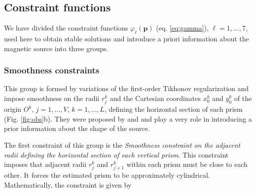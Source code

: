\subsection{Constraint functions}

We have divided the constraint functions $\varphi_{\ell}(\mathbf{p})$ (eq. \ref{eq:gamma}), $\ell = 1, \dots, 7$, used here to 
obtain stable solutions and introduce a priori information about the magnetic source into three groups.



\subsubsection{Smoothness constraints}

This group is formed by variations of the first-order Tikhonov regularization \citep[][ p. 103]{aster-etal2019}
and impose smoothness on the radii $r_{j}^{k}$ and the Cartesian coordinates $x_{0}^{k}$ and $y_{0}^{k}$ of the origin 
$O^{k}$, $j = 1, \dots, V$, $k = 1, \dots, L$, defining the horizontal section of each prism (Fig. \ref{fig:obs}b).
They were proposed by \cite{oliveirajr-etal2011} and \cite{oliveirajr-barbosa2013} and play a very 
role in introducing a prior information about the shape of the source. 

The first constraint of this group is the \textit{Smoothness constraint on the adjacent radii defining the horizontal 
section of each vertical prism}. This constraint imposes that adjacent radii $r_{j}^{k}$ and $r_{j+1}^{k}$ within each 
prism must be close to each other. It forces the estimated prism to be approximately cylindrical. Mathematically, the constraint is given by

